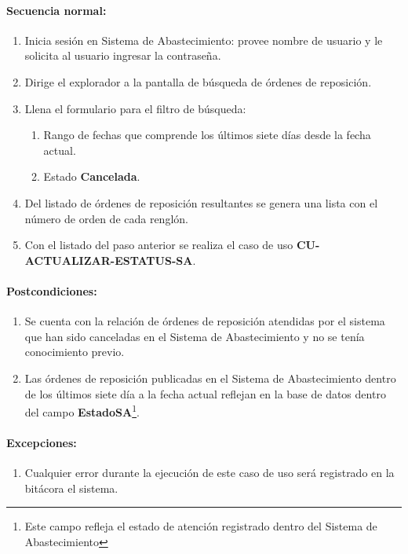 \paragraph{Secuencia normal:}
\begin{enumerate}
  \item Inicia sesión en Sistema de Abastecimiento: provee nombre de usuario y le solicita al usuario ingresar la contraseña.
  \item Dirige el explorador a la pantalla de búsqueda de órdenes de reposición.
  \item Llena el formulario para el filtro de búsqueda:
  \begin{enumerate}
    \item Rango de fechas que comprende los últimos siete días desde la fecha actual.
    \item Estado \textbf{Cancelada}.
  \end{enumerate}
  \item Del listado de órdenes de reposición resultantes se genera una lista con el número de orden de cada renglón.
  \item Con el listado del paso anterior se realiza el caso de uso \textbf{CU-ACTUALIZAR-ESTATUS-SA}.
\end{enumerate}
\paragraph{Postcondiciones:}
\begin{enumerate}
  \item Se cuenta con la relación de órdenes de reposición atendidas por el sistema que han sido canceladas en el Sistema de Abastecimiento y no se tenía conocimiento previo.
  \item Las órdenes de reposición publicadas en el Sistema de Abastecimiento dentro de los últimos siete día a la fecha actual reflejan en la base de datos dentro del campo \textbf{EstadoSA}\footnote{Este campo refleja el estado de atención registrado dentro del Sistema de Abastecimiento}.
\end{enumerate}
\paragraph{Excepciones:}
\begin{enumerate}
  \item Cualquier error durante la ejecución de este caso de uso será registrado en la bitácora el sistema.
\end{enumerate}


